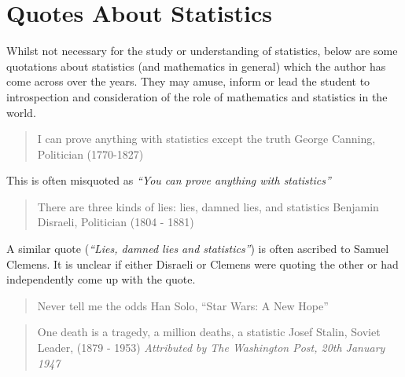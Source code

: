 \chapter{Quotes About Statistics} \label{Quotes About Statistics}

Whilst not necessary for the study or understanding of statistics, below are some quotations about statistics (and mathematics in general) which the author has come across over the years.  They may amuse, inform or lead the student to introspection and consideration of the role of mathematics and statistics in the world.

\woptionrule{}

\begin{quote}
    I can prove anything with statistics except the truth \textemdash George Canning, Politician (1770-1827) 
\end{quote}

\begin{aside}
This is often misquoted as \emph{``You can prove anything with statistics''}
\end{aside}

\cenoptionrule{}

\begin{quote}
    There are three kinds of lies: lies, damned lies, and statistics \textemdash Benjamin Disraeli, Politician (1804 - 1881) 
\end{quote}

\begin{aside}
A similar quote (\emph{``Lies, damned lies and statistics''}) is often ascribed to Samuel Clemens.    It is unclear if either Disraeli or Clemens were quoting the other or had independently come up with the quote.
\end{aside}

\cenoptionrule{}

\begin{quote}
    Never tell me the odds \textemdash Han Solo, ``Star Wars: A New Hope''
\end{quote}

\cenoptionrule{}

\begin{quote}
    One death is a tragedy, a million deaths, a statistic \textemdash Josef Stalin, Soviet Leader, (1879 - 1953)  \emph{Attributed by The Washington Post, 20th January 1947}
\end{quote}

